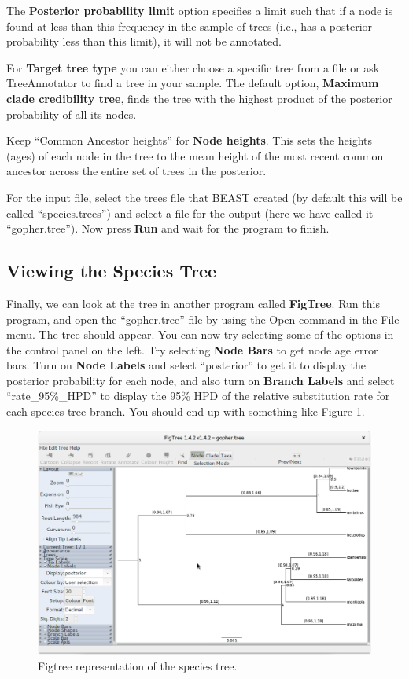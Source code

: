 \documentclass{article}
\begin{document}
The \textbf{Posterior probability limit} option specifies a limit such that if a
node is found at less than this frequency in the sample of trees (i.e., has a
posterior probability less than this limit), it will not be annotated.

For \textbf{Target tree type} you can either choose a specific tree from a file
or ask TreeAnnotator to find a tree in your sample. The default option,
\textbf{Maximum clade credibility tree}, finds the tree with the highest product
of the posterior probability of all its nodes.

Keep ``Common Ancestor heights'' for \textbf{Node heights}. This sets the
heights (ages) of each node in the tree to the mean height of the most recent
common ancestor across the entire set of trees in the posterior.

For the input file, select the trees file that BEAST created (by default this
will be called ``species.trees'') and select a file for the output (here we
have called it ``gopher.tree''). Now press \textbf{Run} and wait for the
program to finish.

\subsection*{Viewing the Species Tree}

Finally, we can look at the tree in another program called \textbf{FigTree}. Run
this program, and open the ``gopher.tree'' file by using the Open command
in the File menu. The tree should appear. You can now try selecting some of the
options in the control panel on the left. Try selecting \textbf{Node Bars} to
get node age error bars. Turn on \textbf{Node Labels} and select
``posterior'' to get it to display the posterior probability for each node,
and also turn on \textbf{Branch Labels} and select ``rate\_95\%\_HPD'' to display
the 95\% HPD of the relative substitution rate for each species tree branch.
You should end up with something like Figure \ref{fig:figtree}.

\begin{figure}[htb!]
\centering
\includegraphics[width=\textwidth]{figures/figtree.png}
\caption{Figtree representation of the species tree.}
\label{fig:figtree}
\end{figure}
\end{document}
